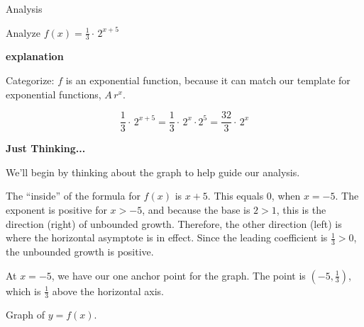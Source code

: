 \documentclass{ximera}
\begin{document}
\begin{example}  Analysis



Analyze   $f(x) = \frac{1}{3} \cdot \, 2^{x+5}$ 




\textbf{\textcolor{red!75!green}{explanation}} 




Categorize: $f$ is an exponential function, because it can match our template for exponential functions, $A \, r^x$.


\[
\frac{1}{3} \cdot \, 2^{x+5} = \frac{1}{3} \cdot \, 2^{x} \cdot 2^{5} = \frac{32}{3} \cdot \, 2^{x}
\]


\textbf{Just Thinking...}  

We'll begin by thinking about the graph to help guide our analysis. 






The ``inside'' of the formula for $f(x)$ is $x+5$.  This equals $0$, when $x=-5$.  The exponent is positive for $x>-5$, and because the base is $2 > 1$, this is the direction (right) of unbounded growth.  Therefore, the other direction (left) is where the horizontal asymptote is in effect.  Since the leading coefficient is $\frac{1}{3} > 0$, the unbounded growth is positive.

At $x=-5$, we have our one anchor point for the graph.  The point is $\left(-5, \frac{1}{3} \right)$, which is $\frac{1}{3}$ above the horizontal axis.


Graph of $y = f(x)$.

\begin{image}
\end{image}
\end{example}
\end{document}
